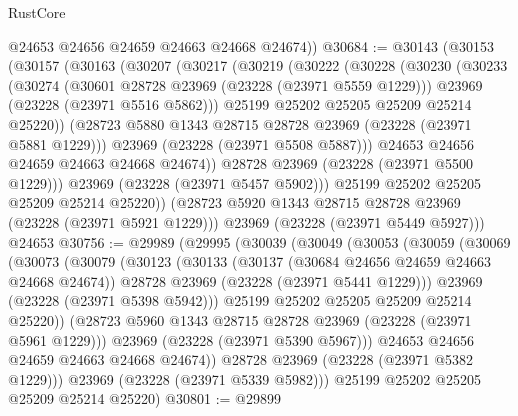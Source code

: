 \begin{lexlean}{RustCore}
\begin{coremodule}
        @24653
        @24656
        @24659
        @24663
        @24668
        @24674))
@30684 := @30143
    (@30153
      (@30157
        (@30163
          (@30207
            (@30217
              (@30219
                (@30222
                  (@30228
                    (@30230
                      (@30233
                        (@30274
                          (@30601 @28728 @23969 (@23228 (@23971 @5559 @1229)))
                          @23969
                          (@23228 (@23971 @5516 @5862)))
                        @25199
                        @25202
                        @25205
                        @25209
                        @25214
                        @25220))
                    (@28723 @5880 @1343 @28715 @28728 @23969 (@23228 (@23971 @5881 @1229)))
                    @23969
                    (@23228 (@23971 @5508 @5887)))
                  @24653
                  @24656
                  @24659
                  @24663
                  @24668
                  @24674))
              @28728
              @23969
              (@23228 (@23971 @5500 @1229)))
            @23969
            (@23228 (@23971 @5457 @5902)))
          @25199
          @25202
          @25205
          @25209
          @25214
          @25220))
      (@28723 @5920 @1343 @28715 @28728 @23969 (@23228 (@23971 @5921 @1229)))
      @23969
      (@23228 (@23971 @5449 @5927)))
    @24653
@30756 := @29989
    (@29995
      (@30039
        (@30049
          (@30053
            (@30059
              (@30069
                (@30073
                  (@30079
                    (@30123
                      (@30133
                        (@30137 (@30684 @24656 @24659 @24663 @24668 @24674))
                        @28728
                        @23969
                        (@23228 (@23971 @5441 @1229)))
                      @23969
                      (@23228 (@23971 @5398 @5942)))
                    @25199
                    @25202
                    @25205
                    @25209
                    @25214
                    @25220))
                (@28723 @5960 @1343 @28715 @28728 @23969 (@23228 (@23971 @5961 @1229)))
                @23969
                (@23228 (@23971 @5390 @5967)))
              @24653
              @24656
              @24659
              @24663
              @24668
              @24674))
          @28728
          @23969
          (@23228 (@23971 @5382 @1229)))
        @23969
        (@23228 (@23971 @5339 @5982)))
      @25199
      @25202
      @25205
      @25209
      @25214
      @25220)
@30801 := @29899

\end{coremodule}
\end{lexlean}

